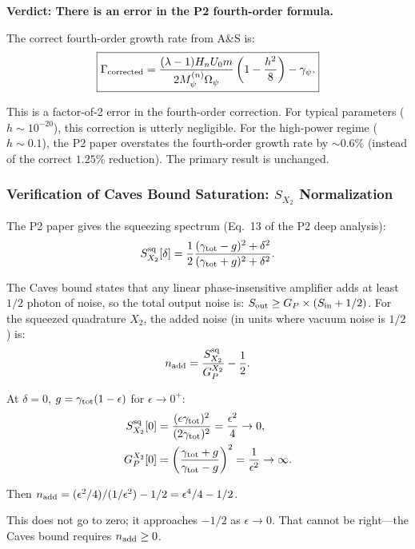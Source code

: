 \documentclass[11pt,twocolumn]{article}
\newcommand{\Opsi}{\Omega_\psi}
\newcommand{\gpsi}{\gamma_\psi}
\newcommand{\Mpsi}{M_\psi}
\begin{document}
\textbf{Verdict: There is an error in the P2 fourth-order formula.}

The correct fourth-order growth rate from A\&S is:
\begin{equation}
\boxed{
\Gamma_{\rm corrected} = \frac{(\lambda-1)H_n U_0 m}{2\Mpsi^{(n)}\Opsi}
\left(1 - \frac{h^2}{8}\right) - \gpsi.
}
\label{eq:gamma_corrected}
\end{equation}

This is a factor-of-2 error in the fourth-order correction. For typical
parameters ($h \sim 10^{-20}$), this correction is utterly negligible.
For the high-power regime ($h \sim 0.1$), the P2 paper overstates the
fourth-order growth rate by $\sim 0.6\%$ (instead of the correct $1.25\%$
reduction). The primary result is unchanged.

\subsubsection{Verification of Caves Bound Saturation: $S_{X_2}$ Normalization}

The P2 paper gives the squeezing spectrum (Eq.~13 of the P2 deep analysis):
\begin{equation}
S_{X_2}^{\rm sq}[\delta] = \frac{1}{2}
\frac{(\gamma_{\rm tot}-g)^2+\delta^2}{(\gamma_{\rm tot}+g)^2+\delta^2}.
\label{eq:sq_check}
\end{equation}

The Caves bound states that any linear phase-insensitive amplifier adds
at least $1/2$ photon of noise, so the total output noise is:
$S_{\rm out} \geq G_P \times (S_{\rm in} + 1/2)$.
For the squeezed quadrature $X_2$, the added noise (in units where vacuum
noise is $1/2$) is:
\begin{equation}
n_{\rm add} = \frac{S_{X_2}^{\rm sq}}{G_P^{X_2}} - \frac{1}{2}.
\end{equation}

At $\delta = 0$, $g = \gamma_{\rm tot}(1-\epsilon)$ for $\epsilon \to 0^+$:
\begin{align}
S_{X_2}^{\rm sq}[0] &= \frac{(\epsilon\gamma_{\rm tot})^2}
{(2\gamma_{\rm tot})^2} = \frac{\epsilon^2}{4} \to 0,
\\
G_P^{X_2}[0] &= \left(\frac{\gamma_{\rm tot}+g}{\gamma_{\rm tot}-g}\right)^2
= \frac{1}{\epsilon^2} \to \infty.
\end{align}

Then $n_{\rm add} = (\epsilon^2/4)/(1/\epsilon^2) - 1/2 = \epsilon^4/4 - 1/2$.

This does not go to zero; it approaches $-1/2$ as $\epsilon\to0$.
That cannot be right---the Caves bound requires $n_{\rm add} \geq 0$.
\end{document}
